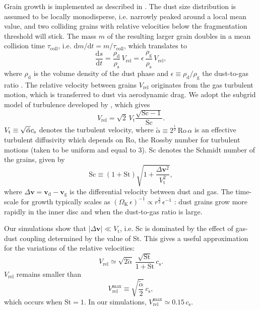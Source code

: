 \documentclass[a4paper,fleqn,usenatbib]{mnras}
\newcommand{\Vrel}{V_\mathrm{rel}}    %
\newcommand{\St}{\mathrm{St}}         %
\begin{document}
Grain growth is implemented as described in \citet{Laibe2008}. The dust size distribution is assumed to be locally monodisperse, i.e. narrowly peaked around a local mean value, and two colliding grains with relative velocities below the fragmentation threshold will stick. The mass $m$ of the resulting larger grain doubles in a mean collision time $\tau_\mathrm{coll}$, i.e. $\mathrm{d}m/\mathrm{d}t=m/\tau_\mathrm{coll}$, which translates to
\begin{equation}
\frac{\mathrm{d}s}{\mathrm{d}t}=\frac{\rho_\mathrm{d}}{\rho_\mathrm{s}}\,\Vrel=\epsilon\,\frac{\rho_\mathrm{g}}{\rho_\mathrm{s}}\,\Vrel,
\label{Eq:dsdt}
\end{equation}
where $\rho_\mathrm{d}$ is the volume density of the dust phase and $\epsilon\equiv\rho_\mathrm{d}/\rho_\mathrm{g}$ the dust-to-gas ratio \citep{SV1997}. The relative velocity between grains $\Vrel$ originates from the gas turbulent motion, which is transferred to dust via aerodynamic drag. We adopt the subgrid model of turbulence developed by \citet{SV1997}, which gives
\begin{equation}
V_\mathrm{rel}=\sqrt{2}\,V_\mathrm{t}\frac{\sqrt{\mathrm{Sc}-1}}{\mathrm{Sc}}.
\label{Eq:Vrel}
\end{equation}
$V_\mathrm{t}\equiv\sqrt{\tilde{\alpha}}c_{\rm s}$ denotes the turbulent velocity, where $\tilde{\alpha}\equiv 2^\frac{1}{2}\,\mathrm{Ro}\,\alpha$ is an effective turbulent diffusivity which depends on Ro, the Rossby number for turbulent motions (taken to be uniform and equal to 3). Sc denotes the Schmidt number of the grains, given by
\begin{equation}
\mathrm{Sc} \equiv (1+\St)\sqrt{1+\frac{\Delta\boldsymbol{v}^2}{V_\mathrm{t}^2}},
\label{Eq:Sc}
\end{equation}
where $\Delta\boldsymbol{v}=\boldsymbol{v}_\mathrm{d}-\boldsymbol{v}_\mathrm{g}$ is the differential velocity between dust and gas. The time-scale for growth typically scales as $(\Omega_\mathrm{K}\,\epsilon)^{-1}\propto r^{\frac{3}{2}}\,\epsilon^{-1}$ \citep{Laibe2008}: dust grains grow more rapidly in the inner disc and when the dust-to-gas ratio is large.

Our simulations show that $\left| \Delta\boldsymbol{v} \right| \ll V_\mathrm{t}$, i.e. Sc is dominated by the effect of gas-dust coupling determined by the value of St. This gives a useful approximation for the variations of the relative velocities:
\begin{equation}
V_\mathrm{rel}\simeq\sqrt{2\tilde{\alpha}}\,\frac{\sqrt{\St}}{1+\St}\,c_\mathrm{s}.
\label{Eq:approxVrel}
\end{equation}
$\Vrel$ remains smaller than
\begin{equation}
\Vrel^\mathrm{max}\equiv\sqrt{\frac{\tilde{\alpha}}{2}}\,c_\mathrm{s},
\label{Eq:Vrelmax}
\end{equation}
which occurs when $\mathrm{St}=1$. In our simulations, $\Vrel^\mathrm{max}\simeq0.15\,c_\mathrm{s}$.
\end{document}
